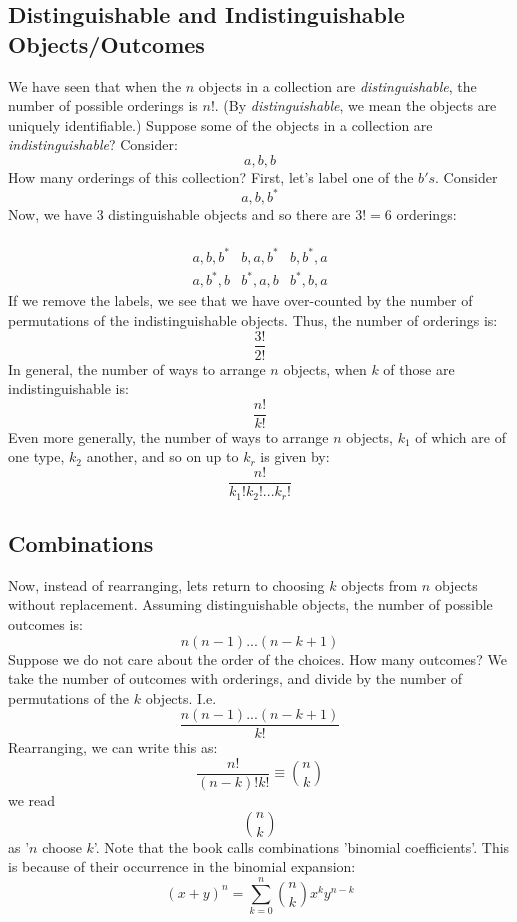 \documentclass[12pt]{article} %
\begin{document}
\subsection{Distinguishable and Indistinguishable Objects/Outcomes}
We have seen that when the $n$ objects in a collection are \emph{distinguishable}, the number of possible orderings is $n!$. (By \emph{distinguishable}, we mean the objects are uniquely identifiable.) Suppose some of the objects in a collection are \emph{indistinguishable}? Consider:
$$a,b,b$$
How many orderings of this collection? First, let's label one of the $b's$. Consider
$$a,b,b^*$$
Now, we have 3 distinguishable objects and so there are $3!=6$ orderings:\\\\

$$\begin{matrix}a,b,b^* &b,a,b^*& b,b^*,a\\
              a,b^*,b&b^*,a,b&b^*,b,a
\end{matrix}$$
If we remove the labels, we see that we have over-counted by the number of permutations of the indistinguishable objects. Thus, the number of orderings is:
$$\frac{3!}{2!}$$
In general, the number of ways to arrange $n$ objects, when $k$ of those are indistinguishable is:
$$\frac{n!}{k!}$$
Even more generally, the number of ways to arrange $n$ objects, $k_1$ of which are of one type, $k_2$ another, and so on up to $k_r$ is given by:
$$\frac{n!}{k_1!k_2!...k_r!}$$
\subsection{Combinations}
Now, instead of rearranging, lets return to choosing $k$ objects from $n$ objects without replacement. Assuming distinguishable objects, the number of possible outcomes is:
$$n(n-1)...(n-k+1)$$
Suppose we do not care about the order of the choices. How many outcomes? We take the number of outcomes with orderings, and divide by the number of permutations of the $k$ objects. I.e.
$$\frac{n(n-1)...(n-k+1)}{k!}$$
Rearranging, we can write this as:
$$\frac{n!}{(n-k)!k!} \equiv {n\choose{k}}$$
we read
$$n\choose{k}$$ 
as '$n$ choose $k$'. Note that the book calls combinations 'binomial coefficients'. This is because of their occurrence in the binomial expansion:
$$\left(x+y\right)^n = \sum_{k=0}^n {n\choose{k}} x^ky^{n-k}$$
\end{document}
